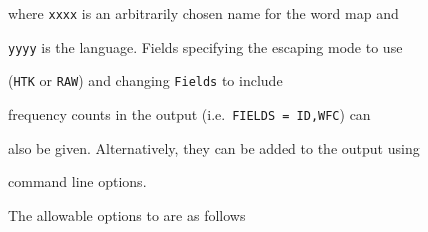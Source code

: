 where \texttt{xxxx} is an arbitrarily chosen name for the word map and


\texttt{yyyy} is the language. Fields specifying the escaping mode to use


(\texttt{HTK} or \texttt{RAW}) and changing \texttt{Fields} to include


frequency counts in the output (i.e.\ \texttt{FIELDS = ID,WFC}) can


also be given.  Alternatively, they can be added to the output using


command line options.





The allowable options to  are as follows





